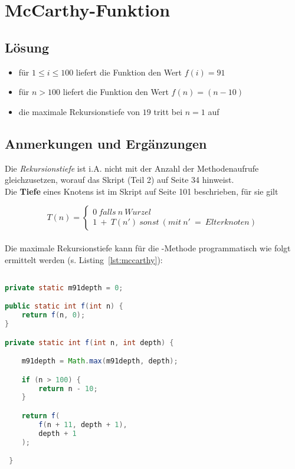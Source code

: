 \chapter{McCarthy-Funktion}

\section*{Lösung}

\begin{itemize}
    \item für $1 \leq i \leq 100$ liefert die Funktion den Wert $f(i) = 91$
    \item für $n > 100$ liefert die Funktion den Wert $f(n) = (n - 10)$
    \item die maximale Rekursionstiefe von $19$ tritt bei $n = 1$ auf
\end{itemize}


\section*{Anmerkungen und Ergänzungen}

Die \textit{Rekursionstiefe} ist i.A. nicht mit der Anzahl der Methodenaufrufe gleichzusetzen, worauf das Skript (Teil 2) auf Seite 34 hinweist.
\\

Die \textbf{Tiefe} eines Knotens ist im Skript auf Seite 101 beschrieben, für sie gilt

\begin{equation}
    T(n) = \begin{cases}
               0\ falls\ n\ Wurzel \\
               1\ +\ T(n')\ sonst\ (mit\ n'\ =\ Elterknoten)
    \end{cases}
\end{equation}\\

Die maximale Rekursionstiefe kann für die -Methode programmatisch wie folgt ermittelt werden (s. Listing~\ref{lst:mccarthy}):

\begin{lstlisting}[language=java,caption={Ermittlung der Rekursiontiefe für die McCarthy 91-Funktion. Die Rekursionstiefe wird in einer statischen Variable gespeichert.},label=lst:mccarthy]

private static m91depth = 0;

public static int f(int n) {
    return f(n, 0);
}

private static int f(int n, int depth) {

    m91depth = Math.max(m91depth, depth);

    if (n > 100) {
        return n - 10;
    }

    return f(
        f(n + 11, depth + 1),
        depth + 1
    );

 }

\end{lstlisting}

